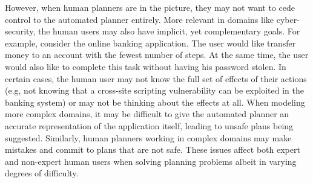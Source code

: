 \documentclass[doctor]{thesis} %
\theoremstyle{plain}
\begin{document}
However, when human planners are in the picture, they may not want to cede control to the automated planner entirely. More relevant in domains like cyber-security, the human users may also have implicit, yet complementary goals. For example, consider the online banking application. The user would like transfer money to an account with the fewest number of steps. At the same time, the user would also like to complete this task without having his password stolen. In certain cases, the human user may not know the full set of effects of their actions (e.g, not knowing that a cross-site scripting vulnerability can be exploited in the banking system) or may not be thinking about the effects at all. When modeling more complex domains, it may be difficult to give the automated planner an accurate representation of the application itself, leading to unsafe plans being suggested. Similarly, human planners working in complex domains may make mistakes and commit to plans that are not safe. These issues affect both expert and non-expert human users when solving planning problems albeit in varying degrees of difficulty.
\end{document}
